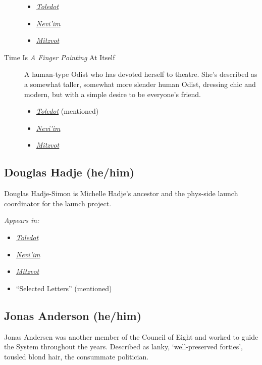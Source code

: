\begin{description}
\begin{itemize}
\tightlist
\item
  \href{https://toledot.post-self.ink}{\emph{Toledot}}
\item
  \href{https://neviim.post-self.ink}{\emph{Nevi'im}}
\item
  \href{https://mitzvot.post-self.ink}{\emph{Mitzvot}}
\end{itemize}
\item[Time Is \emph{A Finger Pointing} At Itself]
A human-type Odist who has devoted herself to theatre. She's described as a somewhat taller, somewhat more slender human Odist, dressing chic and modern, but with a simple desire to be everyone's friend.

\begin{itemize}
\tightlist
\item
  \href{https://toledot.post-self.ink}{\emph{Toledot}} (mentioned)
\item
  \href{https://neviim.post-self.ink}{\emph{Nevi'im}}
\item
  \href{https://mitzvot.post-self.ink}{\emph{Mitzvot}}
\end{itemize}
\end{description}

\subsection{Douglas Hadje (he/him)}

Douglas Hadje-Simon is Michelle Hadje's ancestor and the phys-side launch coordinator for the launch project.

\emph{Appears in:}

\begin{itemize}
\tightlist
\item
  \href{https://toledot.post-self.ink}{\emph{Toledot}}
\item
  \href{https://neviim.post-self.ink}{\emph{Nevi'im}}
\item
  \href{https://mitzvot.post-self.ink}{\emph{Mitzvot}}
\item
  ``Selected Letters'' (mentioned)
\end{itemize}

\subsection{Jonas Anderson (he/him)}

Jonas Andersen was another member of the Council of Eight and worked to guide the System throughout the years. Described as lanky, `well-preserved forties', tousled blond hair, the consummate politician.

